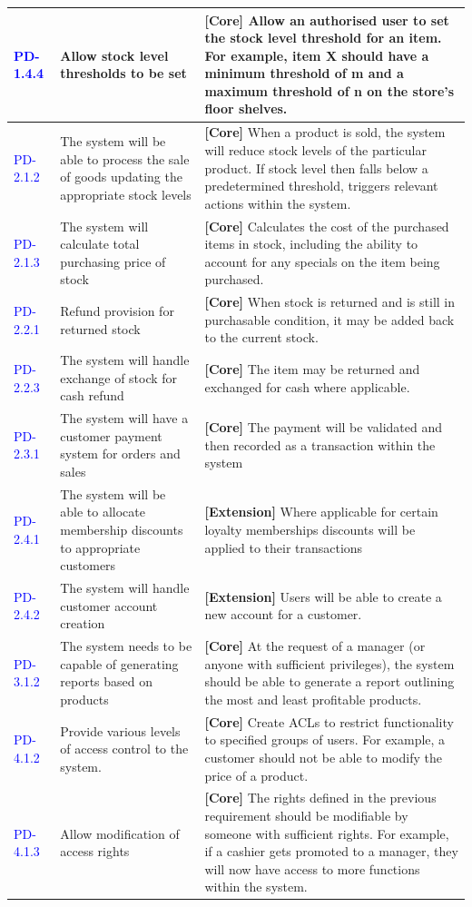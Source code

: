 \documentclass[a4paper]{article}
\begin{document}
\begin{longtable}{|l|p{5cm}|p{8cm}|}
\textcolor{blue}{PD-1.4.4} & Allow stock level thresholds to be set & \textbf{[Core] }Allow an authorised user to set the stock level threshold for an item. For example, item X should have a minimum threshold of m and a maximum threshold of n on the store's floor shelves.\\
\hline
\textcolor{blue}{PD-2.1.2} & The system will be able to process the sale of goods updating the appropriate stock levels & \textbf{[Core] }When a product is sold, the system will reduce stock levels of the particular product. If stock level then falls below a predetermined threshold, triggers relevant actions within the system.\\
\textcolor{blue}{PD-2.1.3} & The system will calculate total purchasing price of stock & \textbf{[Core] }Calculates the cost of the purchased items in stock, including the ability to account for any specials on the item being purchased.\\
\hline
\textcolor{blue}{PD-2.2.1} & Refund provision for returned stock & \textbf{[Core] }When stock is returned and is still in purchasable condition, it may be added back to the current stock.\\
\textcolor{blue}{PD-2.2.3} & The system will handle exchange of stock for cash refund & \textbf{[Core] }The item may be returned and exchanged for cash where applicable.\\
\hline
\textcolor{blue}{PD-2.3.1} & The system will have a customer payment system for orders and sales & \textbf{[Core] }The payment will be validated and then recorded as a transaction within the system\\
\hline
\textcolor{blue}{PD-2.4.1} & The system will be able to allocate membership discounts to appropriate customers & \textbf{[Extension] }Where applicable for certain loyalty memberships discounts will be applied to their transactions\\
\textcolor{blue}{PD-2.4.2} & The system will handle customer account creation & \textbf{[Extension] }Users will be able to create a new account for a customer.\\
\hline
\textcolor{blue}{PD-3.1.2} & The system needs to be capable of generating reports based on products & \textbf{[Core] }At the request of a manager (or anyone with sufficient privileges), the system should be able to generate a report outlining the most and least profitable products.\\
\hline
\textcolor{blue}{PD-4.1.2} & Provide various levels of access control to the system. & \textbf{[Core] }Create ACLs to restrict functionality to specified groups of users. For example, a customer should not be able to modify the price of a product.\\
\textcolor{blue}{PD-4.1.3} & Allow modification of access rights & \textbf{[Core] }The rights defined in the previous requirement should be modifiable by someone with sufficient rights. For example, if a cashier gets promoted to a manager, they will now have access to more functions within the system.\\
\hline

  \hline
\end{longtable}

\appendix
\end{document}
